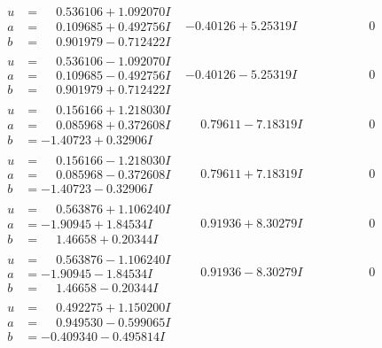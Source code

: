 \documentclass[1p]{elsarticle_modified}
\theoremstyle{definition}
\begin{document}
$$\begin{array}{c|c|c}
\begin{aligned}
u &= \phantom{-}0.536106 + 1.092070 I \\
a &= \phantom{-}0.109685 + 0.492756 I \\
b &= \phantom{-}0.901979 - 0.712422 I\end{aligned}
 & -0.40126 + 5.25319 I & \phantom{-0.000000 } 0 \\ \hline\begin{aligned}
u &= \phantom{-}0.536106 - 1.092070 I \\
a &= \phantom{-}0.109685 - 0.492756 I \\
b &= \phantom{-}0.901979 + 0.712422 I\end{aligned}
 & -0.40126 - 5.25319 I & \phantom{-0.000000 } 0 \\ \hline\begin{aligned}
u &= \phantom{-}0.156166 + 1.218030 I \\
a &= \phantom{-}0.085968 + 0.372608 I \\
b &= -1.40723 + 0.32906 I\end{aligned}
 & \phantom{-}0.79611 - 7.18319 I & \phantom{-0.000000 } 0 \\ \hline\begin{aligned}
u &= \phantom{-}0.156166 - 1.218030 I \\
a &= \phantom{-}0.085968 - 0.372608 I \\
b &= -1.40723 - 0.32906 I\end{aligned}
 & \phantom{-}0.79611 + 7.18319 I & \phantom{-0.000000 } 0 \\ \hline\begin{aligned}
u &= \phantom{-}0.563876 + 1.106240 I \\
a &= -1.90945 + 1.84534 I \\
b &= \phantom{-}1.46658 + 0.20344 I\end{aligned}
 & \phantom{-}0.91936 + 8.30279 I & \phantom{-0.000000 } 0 \\ \hline\begin{aligned}
u &= \phantom{-}0.563876 - 1.106240 I \\
a &= -1.90945 - 1.84534 I \\
b &= \phantom{-}1.46658 - 0.20344 I\end{aligned}
 & \phantom{-}0.91936 - 8.30279 I & \phantom{-0.000000 } 0 \\ \hline\begin{aligned}
u &= \phantom{-}0.492275 + 1.150200 I \\
a &= \phantom{-}0.949530 - 0.599065 I \\
b &= -0.409340 - 0.495814 I\end{aligned}

\end{array}$$
\end{document}
